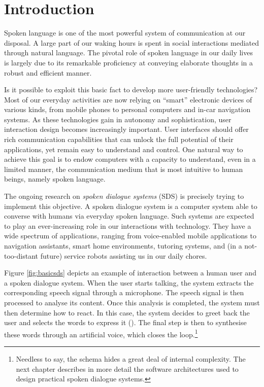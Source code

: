 
\chapter{Introduction}
\setcounter{page}{1}

Spoken language is one of the most powerful system of communication at our disposal. A large part of our waking hours is spent in social interactions mediated through natural language.  The pivotal role of spoken language in our daily lives is largely due to its remarkable proficiency at conveying elaborate thoughts in a robust and efficient manner. 

Is it possible to exploit this basic fact to develop more user-friendly technologies? Most of our everyday activities are now relying on ``smart'' electronic devices of various kinds, from mobile phones to personal computers and in-car navigation systems. As these technologies gain in autonomy and sophistication, user interaction design becomes increasingly important. User interfaces should offer rich communication capabilities that can unlock the full potential of their applications, yet remain easy to understand and control.  One natural way to achieve this goal is to endow computers with a capacity to understand, even in a limited manner, the communication medium that is most intuitive to human beings, namely spoken language.  

The ongoing research on \textit{spoken dialogue systems} (SDS) is precisely trying to implement this objective. A spoken dialogue system is a computer system able to converse with humans via everyday spoken language. Such systems are expected to play an ever-increasing role in our interactions with technology. They have a wide spectrum of applications, ranging from voice-enabled mobile applications to navigation assistants, smart home environments, tutoring systems, and (in a not-too-distant future) service robots assisting us in our daily chores.

Figure \ref{fig:basicsds} depicts an example of interaction between a human user and a spoken dialogue system. When the user starts talking, the system extracts the corresponding speech signal through a microphone.  The speech signal is then processed to analyse its content.  Once this analysis is completed, the system must then determine how to react.  In this case, the system decides to greet back the user and selects the words to express it (). The final step is then to synthesise these words through an artificial voice, which closes the loop.\footnote{ Needless to say, the schema hides a great deal of internal complexity.  The next chapter describes in more detail the software architectures used to design practical spoken dialogue systems.}

